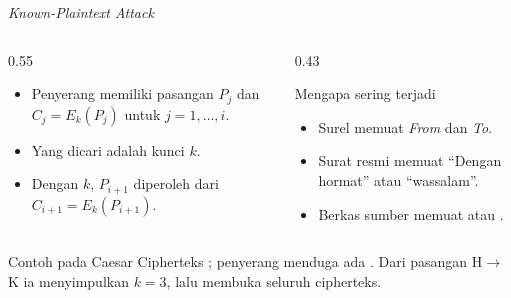 \documentclass[aspectratio=169,11pt]{beamer}
\begin{document}
\begin{frame}{\textit{Known-Plaintext Attack}}
    \begin{columns}[T,onlytextwidth]
        \begin{column}{0.55\textwidth}
            \begin{itemize}
                \item Penyerang memiliki pasangan $P_j$ dan $C_j=E_k(P_j)$
                      untuk $j=1,\dots,i$.
                \item Yang dicari adalah kunci $k$.
                \item Dengan $k$, $P_{i+1}$ diperoleh dari
                      $C_{i+1}=E_k(P_{i+1})$.
            \end{itemize}
        \end{column}
        \begin{column}{0.43\textwidth}
            \begin{exampleblock}{Mengapa sering terjadi}
                \footnotesize
                \begin{itemize}
                    \item Surel memuat \textit{From} dan \textit{To}.
                    \item Surat resmi memuat ``Dengan hormat'' atau
                          ``wassalam''.
                    \item Berkas sumber memuat  atau
                          .
                \end{itemize}
            \end{exampleblock}
        \end{column}
    \end{columns}
    \vspace{0.1cm}
    \begin{alertblock}{Contoh pada Caesar}
        \footnotesize
        Cipherteks ; penyerang menduga ada .
        Dari pasangan H$\to$K ia menyimpulkan $k=3$, lalu membuka seluruh
        cipherteks.
    \end{alertblock}
\end{frame}
\end{document}
